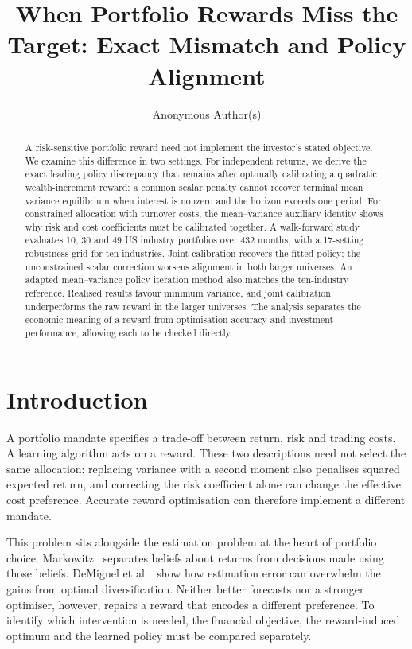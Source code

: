 \documentclass[sigconf,anonymous,review]{acmart}
\title{When Portfolio Rewards Miss the Target: Exact Mismatch and Policy Alignment}
\author{Anonymous Author(s)}
\begin{document}
\begin{abstract}
A risk-sensitive portfolio reward need not implement the investor's stated objective. We examine this difference in two settings. For independent returns, we derive the exact leading policy discrepancy that remains after optimally calibrating a quadratic wealth-increment reward: a common scalar penalty cannot recover terminal mean--variance equilibrium when interest is nonzero and the horizon exceeds one period. For constrained allocation with turnover costs, the mean--variance auxiliary identity shows why risk and cost coefficients must be calibrated together. A walk-forward study evaluates 10, 30 and 49 US industry portfolios over 432 months, with a 17-setting robustness grid for ten industries. Joint calibration recovers the fitted policy; the unconstrained scalar correction worsens alignment in both larger universes. An adapted mean--variance policy iteration method also matches the ten-industry reference. Realised results favour minimum variance, and joint calibration underperforms the raw reward in the larger universes. The analysis separates the economic meaning of a reward from optimisation accuracy and investment performance, allowing each to be checked directly.
\end{abstract}
\maketitle

\section{Introduction}
A portfolio mandate specifies a trade-off between return, risk and trading costs. A learning algorithm acts on a reward. These two descriptions need not select the same allocation: replacing variance with a second moment also penalises squared expected return, and correcting the risk coefficient alone can change the effective cost preference. Accurate reward optimisation can therefore implement a different mandate.

This problem sits alongside the estimation problem at the heart of portfolio choice. Markowitz~\cite{markowitz1952} separates beliefs about returns from decisions made using those beliefs. DeMiguel et al.~\cite{demiguel2009} show how estimation error can overwhelm the gains from optimal diversification. Neither better forecasts nor a stronger optimiser, however, repairs a reward that encodes a different preference. To identify which intervention is needed, the financial objective, the reward-induced optimum and the learned policy must be compared separately.
\end{document}
